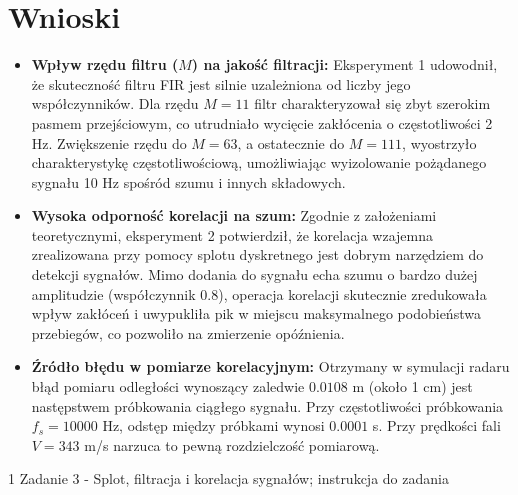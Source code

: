 \documentclass[12pt]{article}
\begin{document}
\section{Wnioski}

\begin{itemize}
    \item \textbf{Wpływ rzędu filtru ($M$) na jakość filtracji:} Eksperyment 1 udowodnił, że skuteczność filtru FIR jest silnie uzależniona od liczby jego współczynników. Dla rzędu $M=11$ filtr charakteryzował się zbyt szerokim pasmem przejściowym, co utrudniało wycięcie zakłócenia o częstotliwości 2 Hz. Zwiększenie rzędu do $M=63$, a ostatecznie do $M=111$,  wyostrzyło charakterystykę częstotliwościową, umożliwiając wyizolowanie pożądanego sygnału 10 Hz spośród szumu i innych składowych.
    \item \textbf{Wysoka odporność korelacji na szum:} Zgodnie z założeniami teoretycznymi, eksperyment 2 potwierdził, że korelacja wzajemna zrealizowana przy pomocy splotu dyskretnego jest dobrym narzędziem do detekcji sygnałów. Mimo dodania do sygnału echa szumu o bardzo dużej amplitudzie (współczynnik 0.8), operacja korelacji skutecznie zredukowała wpływ zakłóceń i uwypukliła pik w miejscu maksymalnego podobieństwa przebiegów, co pozwoliło na zmierzenie opóźnienia.
    \item \textbf{Źródło błędu w pomiarze korelacyjnym:} Otrzymany w symulacji radaru błąd pomiaru odległości wynoszący zaledwie $0.0108$ m (około 1 cm) jest następstwem próbkowania ciągłego sygnału. Przy częstotliwości próbkowania $f_s = 10000$ Hz, odstęp między próbkami wynosi $0.0001$ s. Przy prędkości fali $V = 343$ m/s narzuca to pewną rozdzielczość pomiarową.
\end{itemize}

\begin{thebibliography}{1}
 Zadanie 3 - Splot, ﬁltracja i korelacja sygnałów; instrukcja do zadania
\end{thebibliography}
\end{document}
